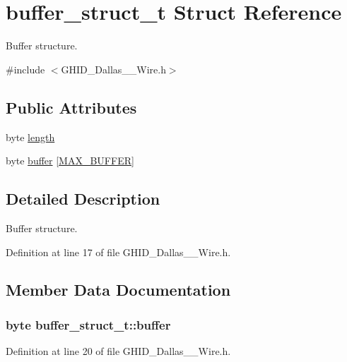 \hypertarget{structbuffer__struct__t}{\section{buffer\-\_\-struct\-\_\-t \-Struct \-Reference}
\label{structbuffer__struct__t}
}


\-Buffer structure.  




{\ttfamily \#include $<$\-G\-H\-I\-D\-\_\-\-Dallas\-\_\-\_\-\-Wire.\-h$>$}

\subsection*{\-Public \-Attributes}
\begin{DoxyCompactItemize}
\item 
byte \hyperlink{structbuffer__struct__t_a812251f18d1b5b93fed46984ed8d7cf1}{length}
\item 
byte \hyperlink{structbuffer__struct__t_a35fecf6dc4e1c70f708188215c85bdfc}{buffer} \mbox{[}\hyperlink{_g_h_i_d___i2_c_8h_a1d5dab30b404fab91608086105afc78c}{\-M\-A\-X\-\_\-\-B\-U\-F\-F\-E\-R}\mbox{]}
\end{DoxyCompactItemize}


\subsection{\-Detailed \-Description}
\-Buffer structure. 

\-Definition at line 17 of file \-G\-H\-I\-D\-\_\-\-Dallas\-\_\-\_\-\-Wire.\-h.



\subsection{\-Member \-Data \-Documentation}
\hypertarget{structbuffer__struct__t_a35fecf6dc4e1c70f708188215c85bdfc}{
\subsubsection[{buffer}]{\setlength{\rightskip}{0pt plus 5cm}byte {\bf buffer\-\_\-struct\-\_\-t\-::buffer}}}\label{structbuffer__struct__t_a35fecf6dc4e1c70f708188215c85bdfc}


\-Definition at line 20 of file \-G\-H\-I\-D\-\_\-\-Dallas\-\_\-\_\-\-Wire.\-h.

